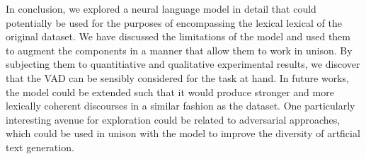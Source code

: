 \documentclass[12pt,twoside]{report}
\begin{document}
In conclusion, we explored a neural language model in detail that could potentially be used for the purposes of encompassing the lexical lexical of the original dataset. We have discussed the limitations of the model and used them to augment the components in a manner that allow them to work in unison. By subjecting them to quantitiative and qualitative experimental results, we discover that the VAD can be sensibly considered for the task at hand. In future works, the model could be extended such that it would produce stronger and more lexically coherent discourses in a similar fashion as the dataset. One particularly interesting avenue for exploration could be related to adversarial approaches, which could be used in unison with the model to improve the diversity of artficial text generation.










\begin{small}
 
\end{small}
\end{document}
